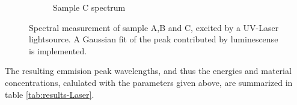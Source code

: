 \begin{figure}
\begin{subfigure}{.32\textwidth}
  \caption{Sample C spectrum}
\end{subfigure}
\caption{Spectral measurement of sample A,B and C, excited by a UV-Laser lightsource. A Gaussian fit of the peak contributed by luminescense is implemented.}
\end{figure}\label{fig:UV-sample-spectra}

The resulting emmision peak wavelengths, and thus the energies and material concentrations, calulated with the parameters given above, are summarized in table \ref{tab:results-Laser}. 

